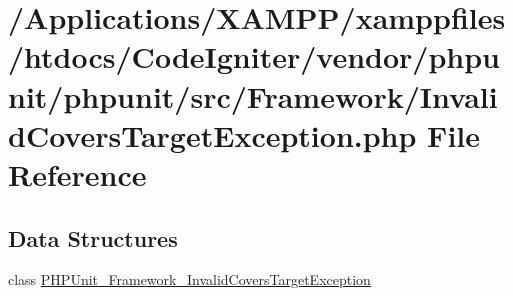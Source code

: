 \hypertarget{_invalid_covers_target_exception_8php}{}\section{/\+Applications/\+X\+A\+M\+P\+P/xamppfiles/htdocs/\+Code\+Igniter/vendor/phpunit/phpunit/src/\+Framework/\+Invalid\+Covers\+Target\+Exception.php File Reference}
\label{_invalid_covers_target_exception_8php}
\subsection*{Data Structures}
\begin{DoxyCompactItemize}
\item 
class \mbox{\hyperlink{class_p_h_p_unit___framework___invalid_covers_target_exception}{P\+H\+P\+Unit\+\_\+\+Framework\+\_\+\+Invalid\+Covers\+Target\+Exception}}
\end{DoxyCompactItemize}
